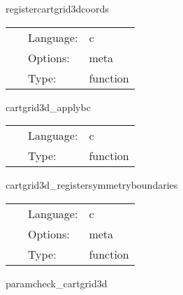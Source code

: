 \hspace{5mm} registercartgrid3dcoords 

\hspace{5mm}{\it register coordinates for the cartesian grid } 


\hspace{5mm}

 \begin{tabular*}{160mm}{cll} 
~ & Language:  & c \\ 
~ & Options:  & meta \\ 
~ & Type:  & function \\ 
\end{tabular*} 


\vspace{5mm}


\hspace{5mm} cartgrid3d\_applybc 

\hspace{5mm}{\it apply symmetry boundary conditions } 


\hspace{5mm}

 \begin{tabular*}{160mm}{cll} 
~ & Language:  & c \\ 
~ & Type:  & function \\ 
\end{tabular*} 


\vspace{5mm}


\hspace{5mm} cartgrid3d\_registersymmetryboundaries 

\hspace{5mm}{\it register symmetry boundaries } 


\hspace{5mm}

 \begin{tabular*}{160mm}{cll} 
~ & Language:  & c \\ 
~ & Options:  & meta \\ 
~ & Type:  & function \\ 
\end{tabular*} 


\vspace{5mm}


\hspace{5mm} paramcheck\_cartgrid3d 

